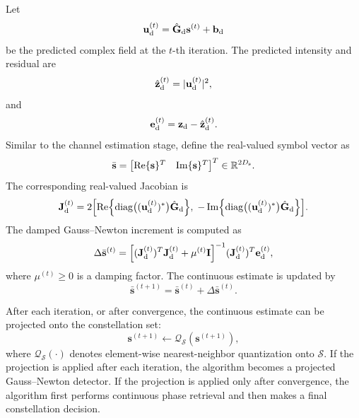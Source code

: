 \documentclass[journal]{IEEEtran}
\begin{document}
Let
\begin{equation}
\mathbf{u}_{\rm d}^{(t)}
=
\hat{\mathbf{G}}_{\rm d}\mathbf{s}^{(t)}
+
\mathbf{b}_{\rm d}
\end{equation}
be the predicted complex field at the $t$-th iteration. 
The predicted intensity and residual are
\begin{equation}
\hat{\mathbf{z}}_{\rm d}^{(t)}
=
|\mathbf{u}_{\rm d}^{(t)}|^2,
\end{equation}
and
\begin{equation}
\mathbf{e}_{\rm d}^{(t)}
=
\mathbf{z}_{\rm d}
-
\hat{\mathbf{z}}_{\rm d}^{(t)}.
\end{equation}
Similar to the channel estimation stage, define the real-valued symbol vector as
\begin{equation}
\bar{\mathbf{s}}
=
\begin{bmatrix}
\operatorname{Re}\{\mathbf{s}\}^T &
\operatorname{Im}\{\mathbf{s}\}^T
\end{bmatrix}^T
\in\mathbb{R}^{2D_{\rm s}}.
\end{equation}
The corresponding real-valued Jacobian is
\begin{equation}
\mathbf{J}_{\mathrm{d}}^{(t)} = 2 \Bigl[ 
    \operatorname{Re} \Bigl\{ 
        \operatorname{diag}\bigl( (\mathbf{u}_{\mathrm{d}}^{(t)})^* \bigr) 
        \hat{\mathbf{G}}_{\mathrm{d}} 
    \Bigr\}, \;
    -\operatorname{Im} \Bigl\{ 
        \operatorname{diag}\bigl( (\mathbf{u}_{\mathrm{d}}^{(t)})^* \bigr) 
        \hat{\mathbf{G}}_{\mathrm{d}} 
    \Bigr\}
\Bigr].
\label{eq:symbol_detection_jacobian}
\end{equation}
The damped Gauss--Newton increment is computed as
\begin{equation}
\Delta\bar{\mathbf{s}}^{(t)} = \Bigl[ 
    (\mathbf{J}_{\mathrm{d}}^{(t)})^T 
    \mathbf{J}_{\mathrm{d}}^{(t)} 
    + \mu^{(t)} \mathbf{I} 
\Bigr]^{-1}
(\mathbf{J}_{\mathrm{d}}^{(t)})^T 
\mathbf{e}_{\mathrm{d}}^{(t)},
\label{eq:symbol_gn_increment}
\end{equation}
where $\mu^{(t)}\geq 0$ is a damping factor. 
The continuous estimate is updated by
\begin{equation}
\bar{\mathbf{s}}^{(t+1)}
=
\bar{\mathbf{s}}^{(t)}
+
\Delta\bar{\mathbf{s}}^{(t)}.
\label{eq:symbol_continuous_update}
\end{equation}

After each iteration, or after convergence, the continuous estimate can be projected onto the constellation set:
\begin{equation}
\mathbf{s}^{(t+1)}
\leftarrow
\mathcal{Q}_{\mathcal{S}}
\left(
\mathbf{s}^{(t+1)}
\right),
\label{eq:constellation_projection}
\end{equation}
where $\mathcal{Q}_{\mathcal{S}}(\cdot)$ denotes element-wise nearest-neighbor quantization onto $\mathcal{S}$. 
If the projection is applied after each iteration, the algorithm becomes a projected Gauss--Newton detector. 
If the projection is applied only after convergence, the algorithm first performs continuous phase retrieval and then makes a final constellation decision.
\end{document}
